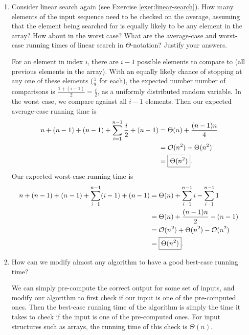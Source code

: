\documentclass[Chapter02]{subfiles}
\begin{document}
\begin{enumerate}[leftmargin=\labelsep]
		\item Consider linear search again (see Exercise \ref{exer:linear-search}). How many elements of the input sequence need to be checked on the average, assuming that the element being searched for is equally likely to be any element in the array? How about in the worst case? What are the average-case and worst-case running times of linear search in $\Theta$-notation? Justify your answers.
		\begin{answer}
			For an element in index $i$, there are $i - 1$ possible elements to compare to (all previous elements in the array). With an equally likely chance of stopping at any one of these elements ($\frac{1}{n}$ for each), the expected number number of comparisons is $\frac{1 + (i - 1)}{2} = \boxed{\frac{i}{2}}$, as a uniformly distributed random variable. In the worst case, we compare against all $\boxed{i - 1}$ elements. Then our expected average-case running time is
			\begin{align*}
				n + (n - 1) + (n - 1) + \sum_{i = 1}^{n - 1} \frac{i}{2} + (n - 1) &= \Theta(n) + \frac{(n-1)n}{4}\\
					&= \mathcal{O}(n^2) + \Theta(n^2)\\
					&= \boxed{\Theta(n^2)}.
			\end{align*}
			Our expected worst-case running time is
			\begin{align*}
				n + (n - 1) + (n - 1) + \sum_{i = 1}^{n - 1} (i - 1) + (n - 1) &= \Theta(n) + \sum_{i = 1}^{n - 1} i - \sum_{i = 1}^{n - 1} 1\\
					&= \Theta(n) + \frac{(n - 1)n}{2} - (n - 1)\\
					&= \mathcal{O}(n^2) + \Theta(n^2) - \mathcal{O}(n^2)\\
					&= \boxed{\Theta(n^2)}.
			\end{align*}
		\end{answer}

		\item How can we modify almost any algorithm to have a good best-case running time?
		\begin{answer}
			We can simply pre-compute the correct output for some set of inputs, and modify our algorithm to first check if our input is one of the pre-computed ones. Then the best-case running time of the algorithm is simply the time it takes to check if the input is one of the pre-computed ones. For input structures such as arrays, the running time of this check is $\Theta(n)$.
		\end{answer}

	\end{enumerate}
\end{document}
